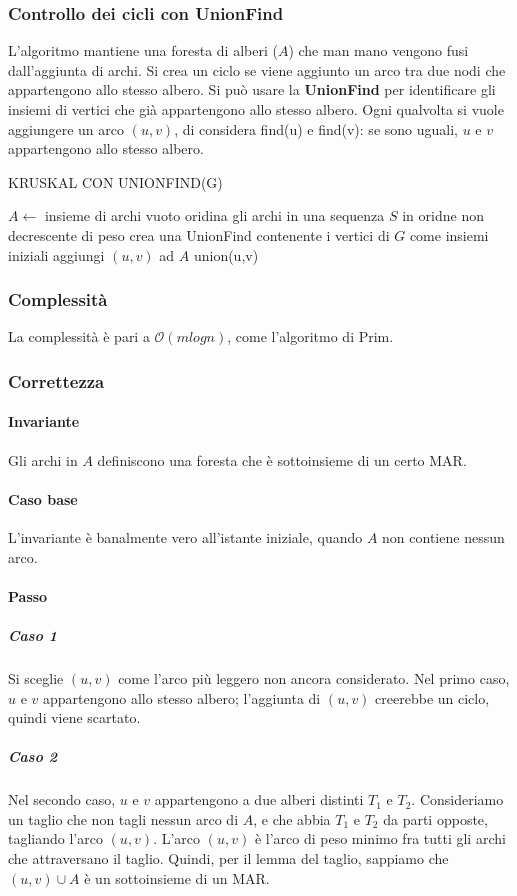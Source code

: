 \documentclass[11pt]{article}
\begin{document}
\subsubsection{Controllo dei cicli con UnionFind}
L'algoritmo mantiene una foresta di alberi ($A$) che man mano vengono fusi dall'aggiunta di archi. Si crea un ciclo se 
viene aggiunto un arco tra due nodi che appartengono allo stesso albero. Si può usare la \textbf{UnionFind} per identificare 
gli insiemi di vertici che già appartengono allo stesso albero. Ogni qualvolta si vuole aggiungere un arco $(u,v)$, di 
considera find(u) e find(v): se sono uguali, $u$ e $v$ appartengono allo stesso albero.
\begin{algorithm}
    \caption{KRUSKAL CON UNIONFIND(G)}
    \begin{algorithmic}
        \State $A\gets$ insieme di archi vuoto 
        \State oridina gli archi in una sequenza $S$ in oridne non decrescente di peso 
        \State crea una UnionFind contenente i vertici di $G$ come insiemi iniziali 
                \State aggiungi $(u,v)$ ad $A$
                \State union(u,v)
            \EndIf 
        \EndFor
    \end{algorithmic}
\end{algorithm}
\subsubsection{Complessità}
La complessità è pari a $\mathcal{O}(mlogn)$, come l'algoritmo di Prim.
\subsubsection{Correttezza}
\paragraph*{Invariante}
Gli archi in $A$ definiscono una foresta che è sottoinsieme di un certo MAR.
\paragraph*{Caso base}
L'invariante è banalmente vero all'istante iniziale, quando $A$ non contiene nessun arco.
\paragraph*{Passo}
\subparagraph*{Caso 1}
Si sceglie $(u,v)$ come l'arco più leggero non ancora considerato. Nel primo caso, $u$ e $v$ appartengono allo stesso 
albero; l'aggiunta di $(u,v)$ creerebbe un ciclo, quindi viene scartato.
\subparagraph*{Caso 2}
Nel secondo caso, $u$ e $v$ appartengono a due alberi distinti $T_1$ e $T_2$. Consideriamo un taglio che non tagli nessun 
arco di $A$, e che abbia $T_1$ e $T_2$ da parti opposte, tagliando l'arco $(u,v)$. L'arco $(u,v)$ è l'arco di peso minimo 
fra tutti gli archi che attraversano il taglio. Quindi, per il lemma del taglio, sappiamo che $(u,v)\cup A$ è un sottoinsieme 
di un MAR.
\end{document}
